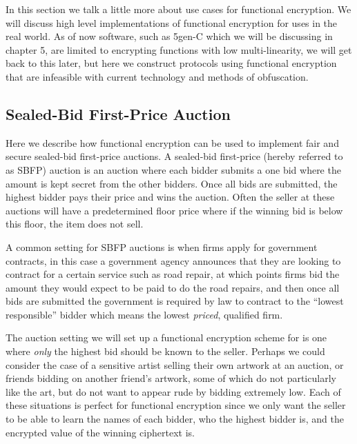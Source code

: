 \documentclass[12pt,twoside]{reedthesis}
\begin{document}
    
    In this section we talk a little more about use cases for functional encryption. We will discuss high level implementations of functional encryption for uses in the real world. As of now software, such as 5gen-C which we will be discussing in chapter 5, are limited to encrypting functions with low multi-linearity, we will get back to this later, but here we construct protocols using functional encryption that are infeasible with current technology and methods of obfuscation.
    \subsection{Sealed-Bid First-Price Auction}
    Here we describe how functional encryption can be used to implement fair and secure sealed-bid first-price auctions. A sealed-bid first-price (hereby referred to as SBFP) auction is an auction where each bidder submits a one bid where the amount is kept secret from the other bidders. Once all bids are submitted, the highest bidder pays their price and wins the auction. Often the seller at these auctions will have a predetermined floor price where if the winning bid is below this floor, the item does not sell. 
    \par A common setting for SBFP auctions is when firms apply for government contracts, in this case a government agency announces that they are looking to contract for a certain service such as road repair, at which points firms bid the amount they would expect to be paid to do the road repairs, and then once all bids are submitted the government is required by law to contract to the ``lowest responsible'' bidder which means the lowest \textit{priced}, qualified firm.
    \par The auction setting we will set up a functional encryption scheme for is one where \textit{only} the highest bid should be known to the seller. Perhaps we could consider the case of a sensitive artist selling their own artwork at an auction, or friends bidding on another friend's artwork, some of which do not particularly like the art, but do not want to appear rude by bidding extremely low. Each of these situations is perfect for functional encryption since we only want the seller to be able to learn the names of each bidder, who the highest bidder is, and the encrypted value of the winning ciphertext is. 
    
    
\end{document}
